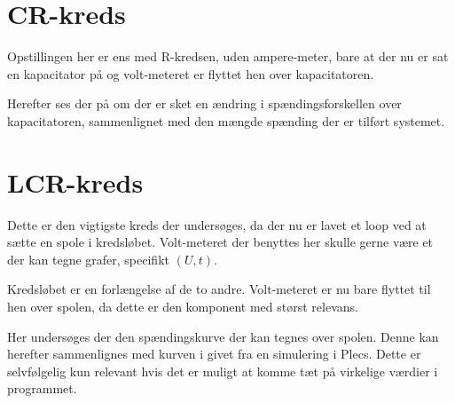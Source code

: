 \section{CR-kreds}
Opstillingen her er ens med R-kredsen, uden ampere-meter, bare at der nu er sat en kapacitator på og volt-meteret er flyttet hen over kapacitatoren.

Herefter ses der på om der er sket en ændring i spændingsforskellen over kapacitatoren, sammenlignet med den mængde spænding der er tilført systemet.
\section{LCR-kreds}
Dette er den vigtigste kreds der undersøges, da der nu er lavet et loop ved at sætte en spole i kredsløbet. Volt-meteret der benyttes her skulle gerne være et der kan tegne grafer, specifikt $(U,t)$.

Kredsløbet er en forlængelse af de to andre. Volt-meteret er nu bare flyttet til hen over spolen, da dette er den komponent med størst relevans.

Her undersøges der den spændingskurve der kan tegnes over spolen. Denne kan herefter sammenlignes med kurven i givet fra en simulering i Plecs. Dette er selvfølgelig kun relevant hvis det er muligt at komme tæt på virkelige værdier i programmet.
